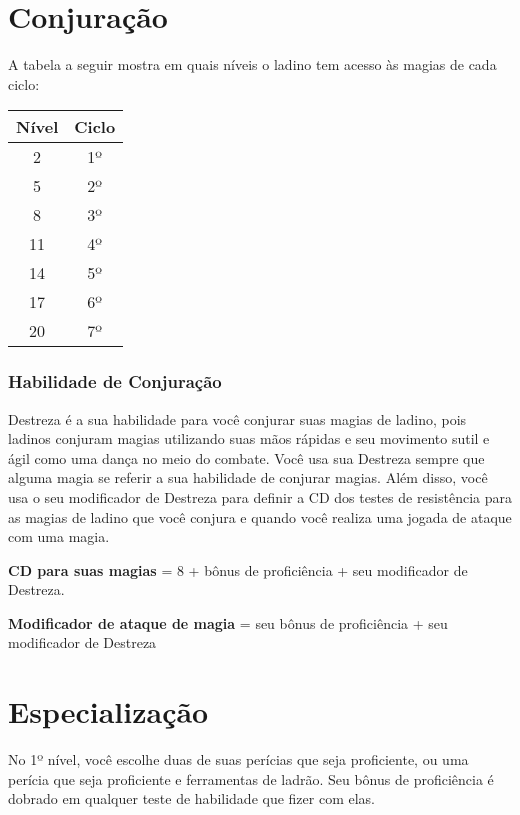 \documentclass{RPG_Adventure}[2021/10/20]
\begin{document}
\begin{multicols}{2}
\section*{Conjuração}%

A tabela a seguir mostra em quais níveis o ladino tem acesso às magias de cada
ciclo:

\begin{center}
\begin{tabular}{|||c||c|||}
    \hline
    \textbf{Nível} & \textbf{Ciclo} \\
    \hline
    2 & 1º \\
    \hline
    5 & 2º \\
    \hline
    8 & 3º \\
    \hline
    11 & 4º \\
    \hline
    14 & 5º \\
    \hline
    17 & 6º \\
    \hline
    20 & 7º \\
    \hline
\end{tabular}
\end{center}


\subsubsection*{Habilidade de Conjuração}%

Destreza é a sua habilidade para você conjurar suas magias de ladino, pois
ladinos conjuram magias utilizando suas mãos rápidas e seu movimento sutil e
ágil como uma dança no meio do combate. Você usa sua Destreza sempre que alguma
magia se referir a sua habilidade de conjurar magias. Além disso, você usa o seu
modificador de Destreza para definir a CD dos testes de resistência para as
magias de ladino que você conjura e quando você realiza uma jogada de ataque com
uma magia.

\begin{center}
\textbf{CD para suas magias} = 8 + bônus de proficiência + seu modificador de
Destreza. \nl

\textbf{Modificador de ataque de magia} = seu bônus de proficiência + seu
modificador de Destreza
\end{center}

\section*{Especialização}%

No 1º nível, você escolhe duas de suas perícias que seja proficiente, ou uma
perícia que seja proficiente e ferramentas de ladrão. Seu bônus de proficiência
é dobrado em qualquer teste de habilidade que fizer com elas.


\end{multicols}
\end{document}

